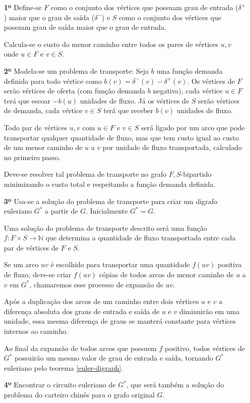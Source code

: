     \begin{enumerate}
        \item[\textbf{1º}] Define-se $F$ como o conjunto dos vértices que possuam grau de entrada ($\delta^+$) maior que o grau de saída ($\delta^-$) e $S$ como o conjunto dos vértices que possuam grau de saída maior que o grau de entrada.

        Calcula-se o custo do menor caminho entre todos os pares de vértices $u, v$ onde $u \in F$ e $v \in S$.

        \item[\textbf{2º}] Modela-se um problema de transporte: 
        Seja $b$ uma função demanda definida para todo vértice como $b(v) = \delta^-(v) - \delta^+(v)$.
        Os vértices de $F$ serão vértices de oferta (com função demanda $b$ negativa), cada vértice $u \in F$ terá que escoar $-b(u)$ unidades de fluxo. 
        Já os vértices de $S$ serão vértices de demanda, cada vértice $v \in S$ terá que receber $b(v)$ unidades de fluxo.

        Todo par de vértices $u, v$ com $u \in F$ e $v \in S$ será ligado por um arco que pode transportar qualquer quantidade de fluxo, mas que tem custo igual ao custo de um menor caminho de $u$ a $v$ por unidade de fluxo transportada, calculado no primeiro passo.

        Deve-se resolver tal problema de transporte no grafo $F,S$-bipartido minimizando o custo total e respeitando a função demanda definida.

        \item[\textbf{3º}] Usa-se a solução do problema de transporte para criar um digrafo euleriano $G^*$ a partir de $G$.
            Inicialmente $G^* = G$.

            Uma solução do problema de transporte descrito será uma função $f: F\times S \rightarrow \mathbb{N}$ que determina a quantidade de fluxo transportada entre cada par de vértices de $F$ e $S$.

            Se um arco $uv$ é escolhido para transportar uma quantidade $f(uv)$ positiva de fluxo, deve-se criar $f(uv)$ cópias de todos arcos do menor caminho de $u$ a $v$ em $G^*$, chamaremos esse processo de expansão de $uv$.

            Após a duplicação dos arcos de um caminho entre dois vértices $u$ e $v$ a diferença absoluta dos graus de entrada e saída de $u$ e $v$ diminuirão em uma unidade, essa mesma diferença de graus se manterá constante para vértices internos ao caminho. 

            Ao final da expansão de todos arcos que possuem $f$ positivo, todos vértices de $G^*$ possuirão um mesmo valor de grau de entrada e saída, tornando $G^*$ euleriano pelo teorema \ref{euler-digraph}.

        \item[\textbf{4º}] Encontrar o circuito euleriano de $G^*$, que será também a solução do problema do carteiro chinês para o grafo original $G$.

    \end{enumerate}


